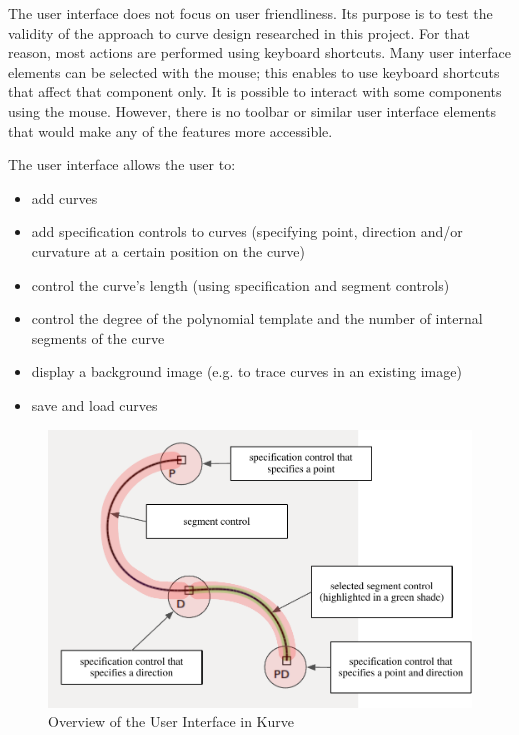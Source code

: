 \documentclass[a4paper]{article}
\begin{document}
				The user interface does not focus on user friendliness. Its purpose is to test the validity of the approach to curve design researched in this project. For that reason, most actions are performed using keyboard shortcuts. Many user interface elements can be selected with the mouse; this enables to use keyboard shortcuts that affect that component only. It is possible to interact with some components using the mouse. However, there is no toolbar or similar user interface elements that would make any of the features more accessible.
				
				The user interface allows the user to:
				\begin{itemize}
					\item add curves
					\item add specification controls to curves (specifying point, direction and/or curvature at a certain position on the curve) 
					\item control the curve's length (using specification and segment controls)
					\item control the degree of the polynomial template and the number of internal segments of the curve
					\item display a background image (e.g. to trace curves in an existing image)
					\item save and load curves
				\end{itemize}
				
				\begin{figure}[htb]
					\centering
					\includegraphics[width=130mm]{content/output/ui_components.pdf}
					\caption{Overview of the User Interface in Kurve}
					\label{figure:ui_components}
				\end{figure}
				
\end{document}
